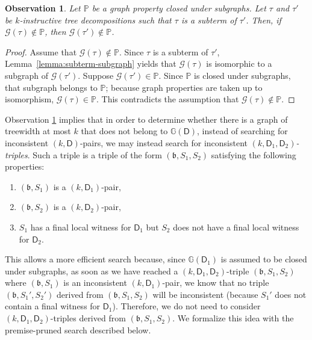 \documentclass[11pt,a4paper]{article}
\newtheorem{observation}[theorem]{Observation}
\newcommand{\treewidthvalue}{k}
\newcommand{\decompositiongraph}[1]{\mathcal{G}(#1)}
\newcommand{\abag}{\mathfrak{b}}
\newcommand{\abstractdecomposition}{\tau}
\newcommand{\graphproperty}{\mathbb{P}}
\newcommand{\dpcoregraphproperty}[1]{\mathbb{G}(#1)}
\newcommand{\dpcore}{\mathsf{D}}
\newcommand{\witnessset}{S}
\begin{document}
\begin{observation}\label{remark:closed-under-subgraph}
Let $\graphproperty$ be a graph property closed under subgraphs. Let $\abstractdecomposition$ and $\abstractdecomposition'$ be $\treewidthvalue$-instructive tree decompositions such that $\abstractdecomposition$ is a subterm of $\abstractdecomposition'$. Then, if $\decompositiongraph{\abstractdecomposition}\notin \graphproperty$, then  $\decompositiongraph{\abstractdecomposition'}\notin\graphproperty$.
\end{observation}
\begin{proof}
Assume that $\decompositiongraph{\abstractdecomposition}\notin \graphproperty$. Since $\abstractdecomposition$ is a subterm of $\abstractdecomposition'$, Lemma~\ref{lemma:subterm-subgraph} yields that $\decompositiongraph{\abstractdecomposition}$ is isomorphic to a subgraph of $\decompositiongraph{\abstractdecomposition'}$. Suppose $\decompositiongraph{\abstractdecomposition'}\in \graphproperty$. Since $\graphproperty$ is closed under subgraphs, that subgraph belongs to $\graphproperty$; because graph properties are taken up to isomorphism, $\decompositiongraph{\abstractdecomposition}\in \graphproperty$. This contradicts the assumption that $\decompositiongraph{\abstractdecomposition}\notin \graphproperty$.
\end{proof}

Observation \ref{remark:closed-under-subgraph} implies that
in order to determine whether there is a graph of treewidth
at most $\treewidthvalue$ that does not belong to
$\dpcoregraphproperty{\dpcore}$, instead of searching for
inconsistent $(\treewidthvalue,\dpcore)$-pairs, we may instead search for inconsistent {\em $(\treewidthvalue,\dpcore_1,\dpcore_2)$-triples}. Such a triple
is a triple of the form $(\abag,\witnessset_1,\witnessset_2)$ satisfying the following properties:

\begin{enumerate}
    \item $(\abag,\witnessset_1)$ is a $(\treewidthvalue,\dpcore_1)$-pair,
    \item $(\abag,\witnessset_2)$ is a
    $(\treewidthvalue,\dpcore_2)$-pair,
    \item $\witnessset_1$ has a final local witness for $\dpcore_1$
    but $\witnessset_2$ does not have a final local witness for
    $\dpcore_2$.
\end{enumerate}

This allows a more efficient search because, since
$\dpcoregraphproperty{\dpcore_1}$ is assumed to be closed under subgraphs,
as soon as we have reached a $(\treewidthvalue,\dpcore_1,\dpcore_2)$-triple $(\abag,\witnessset_1,\witnessset_2)$ where $(\abag,\witnessset_1)$ is an inconsistent $(\treewidthvalue,\dpcore_1)$-pair, we know that no triple $(\abag,\witnessset_1',\witnessset_2')$ derived from
$(\abag,\witnessset_1,\witnessset_2)$ will be inconsistent (because $\witnessset_1'$ does not contain a final witness for $\dpcore_1$).
Therefore, we do not need to consider $(\treewidthvalue,\dpcore_1,\dpcore_2)$-triples derived from
$(\abag,\witnessset_1,\witnessset_2)$. We formalize this idea with the premise-pruned search described below.
\end{document}
